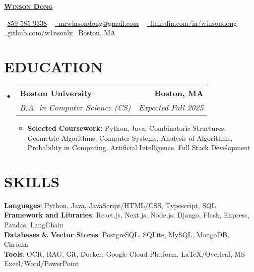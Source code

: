 \documentclass[letterpaper,11pt]{article}
\makeatletter
\newcommand{\resumeItem}[1]{
  \item\small{
    {#1 \vspace{-3pt}}
  }
}
\newcommand{\resumeSubheading}[4]{
  \vspace{-3pt}\item
    \begin{tabular*}{1.0\textwidth}[t]{l@{\extracolsep{\fill}}r}
      \textbf{#1} & \textbf{\small #2} \\
      \textit{\small#3} & \textit{\small #4} \\
    \end{tabular*}\vspace{-7pt}
}
\newcommand{\resumeSubHeadingListStart}{\begin{itemize}[leftmargin=0.0in, label={}]}
\newcommand{\resumeSubHeadingListEnd}{\end{itemize}}
\newcommand{\resumeItemListStart}{\begin{itemize}}
\newcommand{\resumeItemListEnd}
{\end{itemize}\vspace{0pt}}
\makeatother
\begin{document}
    \begin{center}
        {\huge \scshape \textbf{\href{linkedin.com/in/winsondong}{Winson Dong }}}
        
        \small
        \raisebox{-0.2\height}\faPhone\  \underline{859-585-9338} ~ 
        \href{mrwinsondong@gmail.com}{\raisebox{-0.2\height}\faEnvelope\  \underline{mrwinsondong@gmail.com}} ~ 
        \href{linkedin.com/in/winsondong/}{\raisebox{-0.2\height}\faLinkedin\ \underline{linkedin.com/in/winsondong}}  ~
        \href{https://www.github.com/w1nsonly}{\raisebox{-0.2\height}\faGithub\ \underline{github.com/w1nsonly}}
        \raisebox{-0.2\height}\faMapPin \ \underline{Boston, MA}
    \end{center}

\section{EDUCATION}
  \resumeSubHeadingListStart
  
    \resumeSubheading
    {Boston University}{Boston, MA}
    {B.A.  in Computer Science (CS)}{Expected Fall 2025}
        \resumeItemListStart
            \resumeItem{\textbf{Selected Coursework:}  Python, Java, Combinatoric Structures, Geometric Algorithms, Computer Systems, Analysis of Algorithms, Probability in Computing, Artificial Intelligence, Full Stack Development}
        \resumeItemListEnd
        
  \resumeSubHeadingListEnd

\section{SKILLS}

    \vspace{-7pt}
    \begin{itemize}
    [leftmargin=0.15in, label={}]\small{\item{
        \textbf{Languages}{: Python, Java, JavaScript/HTML/CSS, Typescript, SQL} \\
        \textbf{Framework and Libraries}{: React.js, Next.js, Node.js, Django, Flask, Express, Pandas, LangChain} \\
        \textbf{Databases \& Vector Stores}{: PostgreSQL, SQLite, MySQL, MongoDB, Chroma} \\
        \textbf{Tools}{: OCR, RAG, Git, Docker, Google Cloud Platform, LaTeX/Overleaf, MS Excel/Word/PowerPoint} \\
        }}
        
        
    \end{itemize}
\end{document}
